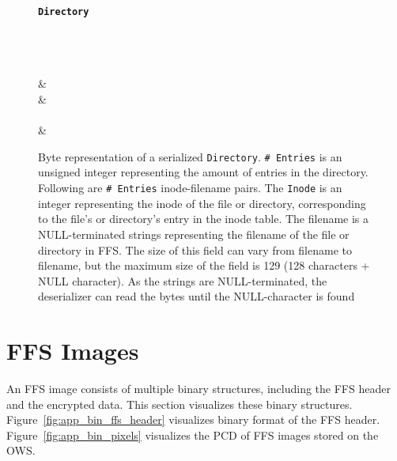 \begin{figure}[!htb]
	\label{fig:app_bin_dir}
	\centering
    \textbf{\texttt{Directory}}\par\medskip

	\begin{bytefield}[bitwidth=0.0625\textwidth]{16}
		 \\
		 \\
		 \\
		 & \\
		 & \\
		 \\[1ex]
		 & \\
	\end{bytefield}
	\caption[Byte representation of the serialization of an \texttt{Directory} object]{Byte representation of a serialized \texttt{Directory}. \texttt{\#~Entries} is an unsigned integer representing the amount of entries in the directory. Following are \texttt{\#~Entries} \mbox{inode-filename} pairs. The \texttt{Inode} is an integer representing the inode of the file or directory, corresponding to the file's or directory's entry in the inode table. The filename is a \mbox{NULL-terminated} strings representing the filename of the file or directory in \gls{FFS}. The size of this field can vary from filename to filename, but the maximum size of the field is \SI{129}{\byte} (128 characters + NULL character). As the strings are \mbox{NULL-terminated}, the deserializer can read the bytes until the \mbox{NULL-character} is found}
\end{figure}
\FloatBarrier

\section{FFS Images}
An \gls{FFS} image consists of multiple binary structures, including the \gls{FFS} header and the encrypted data. This section visualizes these binary structures. Figure~\ref{fig:app_bin_ffs_header} visualizes binary format of the \gls{FFS} header. Figure~\ref{fig:app_bin_pixels} visualizes the \gls{PCD} of \gls{FFS} images stored on the \gls{OWS}.

